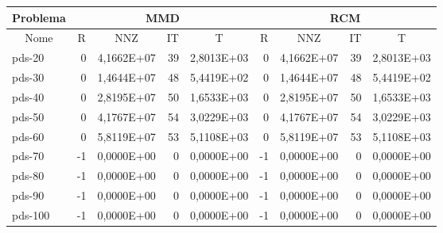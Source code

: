 \begin{tabular}{|l|r|r|r|r|r|r|r|r|}
\hline
\multicolumn{1}{|c|}{Problema} & \multicolumn{4}{|c|}{MMD} &         \multicolumn{4}{|c|}{RCM} \\ \hline
\multicolumn{1}{|c|}{Nome} & \multicolumn{1}{|c|}{R} &
        \multicolumn{1}{|c|}{NNZ} & \multicolumn{1}{|c|}{IT} &
        \multicolumn{1}{|c|}{T} & \multicolumn{1}{|c|}{R} &
        \multicolumn{1}{|c|}{NNZ} & \multicolumn{1}{|c|}{IT} &
        \multicolumn{1}{|c|}{T} \\ \hline
pds-20 & 0 & 4,1662E+07 & 39 & 2,8013E+03 & 0 & 4,1662E+07 & 39 & 2,8013E+03 \\ \hline
pds-30 & 0 & 1,4644E+07 & 48 & 5,4419E+02 & 0 & 1,4644E+07 & 48 & 5,4419E+02 \\ \hline
pds-40 & 0 & 2,8195E+07 & 50 & 1,6533E+03 & 0 & 2,8195E+07 & 50 & 1,6533E+03 \\ \hline
pds-50 & 0 & 4,1767E+07 & 54 & 3,0229E+03 & 0 & 4,1767E+07 & 54 & 3,0229E+03 \\ \hline
pds-60 & 0 & 5,8119E+07 & 53 & 5,1108E+03 & 0 & 5,8119E+07 & 53 & 5,1108E+03 \\ \hline
pds-70 & -1 & 0,0000E+00 & 0 & 0,0000E+00 & -1 & 0,0000E+00 & 0 & 0,0000E+00 \\ \hline
pds-80 & -1 & 0,0000E+00 & 0 & 0,0000E+00 & -1 & 0,0000E+00 & 0 & 0,0000E+00 \\ \hline
pds-90 & -1 & 0,0000E+00 & 0 & 0,0000E+00 & -1 & 0,0000E+00 & 0 & 0,0000E+00 \\ \hline
pds-100 & -1 & 0,0000E+00 & 0 & 0,0000E+00 & -1 & 0,0000E+00 & 0 & 0,0000E+00 \\ \hline
\end{tabular}
